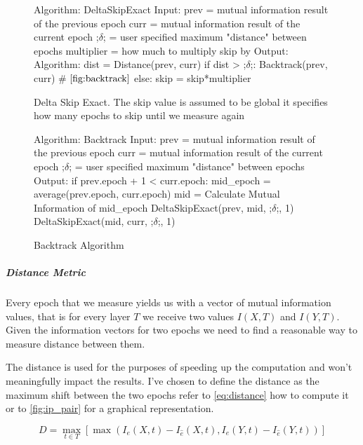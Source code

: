 \documentclass[dissertation.tex]{subfiles}
\begin{document}
  

\begin{figure}[H]
    \begin{pythonfigure}
      Algorithm: DeltaSkipExact
      Input:
      prev = mutual information result of the previous epoch
      curr = mutual information result of the current epoch
      ;$\delta$; = user specified maximum "distance" between epochs
      multiplier = how much to multiply skip by
      Output:
      Algorithm:
      dist = Distance(prev, curr)
      if dist > ;$\delta$;:
        Backtrack(prev, curr) # $\autoref{fig:backtrack}$
      else:
        skip = skip*multiplier
    \end{pythonfigure}
    \caption{Delta Skip Exact. The skip value is assumed to be global it
    specifies how many epochs to skip until we measure again}
    \label{fig:deltaexact}
\end{figure}

\begin{figure}[H]
    \begin{pythonfigure}
      Algorithm: Backtrack
      Input:
      prev = mutual information result of the previous epoch
      curr = mutual information result of the current epoch
      ;$\delta$; = user specified maximum "distance" between epochs
      Output:
      if prev.epoch + 1 < curr.epoch:
        mid_epoch = average(prev.epoch, curr.epoch)
        mid = Calculate Mutual Information of mid_epoch
        DeltaSkipExact(prev, mid, ;$\delta$;, 1)
        DeltaSkipExact(mid, curr, ;$\delta$;, 1)
    \end{pythonfigure}
    \caption{Backtrack Algorithm}
    \label{fig:backtrack}
\end{figure}


  \subparagraph{Distance Metric}
  Every epoch that we measure yields us with a vector of mutual information
  values, that is for every layer $T$ we receive two values $I(X,T)$ and
  $I(Y,T)$. Given the information vectors for two epochs we need to find a
  reasonable way to measure distance between them.

  The distance is used for the purposes of speeding up the computation and won't
  meaningfully impact the results. I've chosen to define the distance as the
  maximum shift between the two epochs refer to \autoref{eq:distance} how to
  compute it or to \autoref{fig:ip_pair} for a graphical representation.

  \begin{equation}
    D = \max_{t\in T} [\max( I_e(X, t) - I_{\hat{e}}(X, t), I_e(Y, t) - I_{\hat{e}}(Y, t))]
    \label{eq:distance}
  \end{equation} 
\end{document}
